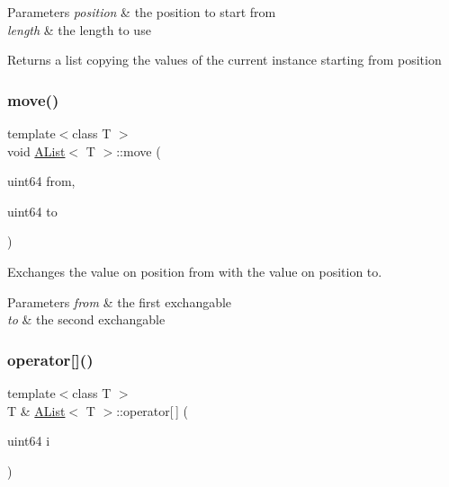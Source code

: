 \begin{DoxyParams}{Parameters}
{\em position} & the position to start from \\
\hline
{\em length} & the length to use \\
\hline
\end{DoxyParams}
\begin{DoxyReturn}{Returns}
a list copying the values of the current instance starting from position 
\end{DoxyReturn}
\mbox{\label{class_a_list_af091a1d7ddb9a3b9becc827da8eded09}} 
\subsubsection{\texorpdfstring{move()}{move()}}
{\footnotesize\ttfamily template$<$class T $>$ \\
void \mbox{\hyperlink{class_a_list}{A\+List}}$<$ T $>$\+::move (\begin{DoxyParamCaption}\item[{uint64}]{from,  }\item[{uint64}]{to }\end{DoxyParamCaption})}



Exchanges the value on position from with the value on position to. 


\begin{DoxyParams}{Parameters}
{\em from} & the first exchangable \\
\hline
{\em to} & the second exchangable \\
\hline
\end{DoxyParams}
\mbox{\label{class_a_list_a85d2ad05e1b20339f6dfc64bcd37026f}} 
\subsubsection{\texorpdfstring{operator[]()}{operator[]()}\hspace{0.1cm}{\footnotesize\ttfamily [1/2]}}
{\footnotesize\ttfamily template$<$class T $>$ \\
T \& \mbox{\hyperlink{class_a_list}{A\+List}}$<$ T $>$\+::operator\mbox{[}$\,$\mbox{]} (\begin{DoxyParamCaption}\item[{uint64}]{i }\end{DoxyParamCaption})\hspace{0.3cm}{\ttfamily [inline]}}



